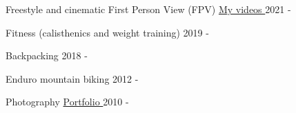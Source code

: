 



\begin{cvhonors}

  \cvhonor
    {Freestyle and cinematic First Person View (FPV)} %
    {\href{https://youtube.com/playlist?list=PLEQ2_c7qeA6DjCiLIgne3NqDGCWMMz1Aq&si=rV8HMrt6FnQeEZHP}{My videos \ExternalLink}} %
    {} %
    {2021 -} %

  \cvhonor
    {Fitness (calisthenics and weight training)} %
    {} %
    {} %
    {2019 -} %

  \cvhonor
    {Backpacking} %
    {} %
    {} %
    {2018 -} %

  \cvhonor
    {Enduro mountain biking} %
    {} %
    {} %
    {2012 -} %

  \cvhonor
    {Photography} %
    {\href{https://portfolio.pbreuer.de}{Portfolio \ExternalLink}} %
    {} %
    {2010 -} %

\end{cvhonors}